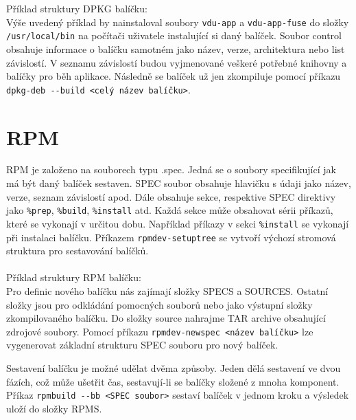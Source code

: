 \noindent Příklad struktury DPKG balíčku: 
\\
\bigskip
Výše uvedený příklad by nainstaloval soubory \texttt{vdu-app} a \texttt{vdu-app-fuse} do složky \texttt{/usr/local/bin} na počítači uživatele instalující si daný balíček. Soubor 
control obsahuje informace o balíčku samotném jako název, verze, architektura nebo list závislostí. V seznamu závislostí budou vyjmenované veškeré potřebné knihovny a balíčky
pro běh aplikace. Následně se balíček už jen zkompiluje pomocí příkazu \texttt{\mbox{dpkg-deb -{}-build <celý název balíčku>}}.

\section{RPM}

RPM je založeno na souborech typu .spec. Jedná se o soubory specifikující jak má být daný balíček sestaven. SPEC soubor obsahuje hlavičku s údaji jako název, verze, seznam
závislostí apod. Dále obsahuje sekce, respektive SPEC direktivy jako \texttt{\%prep}, \texttt{\%build}, \texttt{\%install} atd. Každá sekce může obsahovat sérii příkazů,
které se vykonají v určitou dobu. Například příkazy v sekci \texttt{\%install} se vykonají při instalaci balíčku. Příkazem \texttt{rpmdev-setuptree} se vytvoří výchozí stromová
struktura pro sestavování balíčků.
\\\\
\noindent Příklad struktury RPM balíčku: 
\\
\bigskip
Pro definic nového balíčku nás zajímají složky SPECS a SOURCES. Ostatní složky jsou pro odkládání pomocných souborů nebo jako výstupní složky zkompilovaného balíčku.
Do složky source nahrajme TAR archive obsahující zdrojové soubory. Pomocí příkazu \texttt{\mbox{rpmdev-newspec <název balíčku>}} lze vygenerovat základní strukturu SPEC 
souboru pro nový balíček.

Sestavení balíčku je možné udělat dvěma způsoby. Jeden dělá sestavení ve dvou fázích, což může ušetřit čas, sestavují-li se balíčky složené z mnoha komponent.
Příkaz \texttt{\mbox{rpmbuild -{}-bb <SPEC soubor>}} sestaví balíček v jednom kroku a výsledek uloží do složky RPMS.

